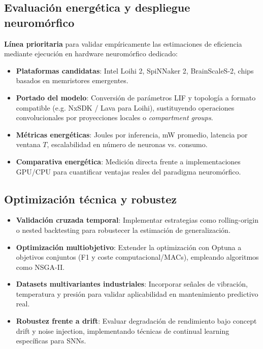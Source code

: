 \subsection{Evaluación energética y despliegue neuromórfico}
\label{subsec:trabajo-futuro-neuromorfico}
\textbf{Línea prioritaria} para validar empíricamente las estimaciones de eficiencia mediante ejecución en hardware neuromórfico dedicado:
\begin{itemize}
    \item \textbf{Plataformas candidatas}: Intel Loihi 2, SpiNNaker 2, BrainScaleS-2, chips basados en memristores emergentes.
    \item \textbf{Portado del modelo}: Conversión de parámetros LIF y topología a formato compatible (e.g. NxSDK / Lava para Loihi), sustituyendo operaciones convolucionales por proyecciones locales o \textit{compartment groups}.
    \item \textbf{Métricas energéticas}: Joules por inferencia, mW promedio, latencia por ventana \(T\), escalabilidad en número de neuronas vs. consumo.
    \item \textbf{Comparativa energética}: Medición directa frente a implementaciones GPU/CPU para cuantificar ventajas reales del paradigma neuromórfico.
\end{itemize}

\subsection{Optimización técnica y robustez}
\begin{itemize}
    \item \textbf{Validación cruzada temporal}: Implementar estrategias como rolling-origin o nested backtesting para robustecer la estimación de generalización.
    \item \textbf{Optimización multiobjetivo}: Extender la optimización con Optuna a objetivos conjuntos (F1 y coste computacional/MACs), empleando algoritmos como NSGA-II.
    \item \textbf{Datasets multivariantes industriales}: Incorporar señales de vibración, temperatura y presión para validar aplicabilidad en mantenimiento predictivo real.
    \item \textbf{Robustez frente a drift}: Evaluar degradación de rendimiento bajo concept drift y noise injection, implementando técnicas de continual learning específicas para SNNs.
\end{itemize}

